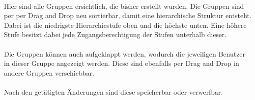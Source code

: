 \paragraph{}Hier sind alle Gruppen ersichtlich, die bisher erstellt wurden.
Die Gruppen sind per per Drag and Drop neu sortierbar, damit eine hierarchische Struktur entsteht.
Dabei ist die niedrigste Hierarchiestufe oben und die höchste unten. 
Eine höhere Stufe besitzt dabei jede Zugangsberechtigung der Stufen unterhalb dieser. 
\\
\paragraph{}Die Gruppen können auch aufgeklappt werden, wodurch die jeweiligen Benutzer in dieser Gruppe angezeigt werden.
Diese sind ebenfalls per Drag and Drop in andere Gruppen verschiebbar.
\\
\paragraph{}Nach den getätigten Änderungen sind diese speicherbar oder verwerfbar. 

